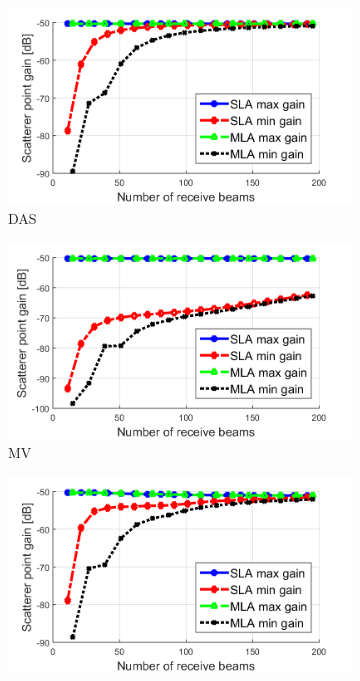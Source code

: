 \begin{figure}[ht]
    \centering
    \begin{subfigure}[t]{0.48\linewidth}
        \includegraphics[width=\linewidth]{./images/results/4/gain_DAS.png}
        \caption{DAS}
    \end{subfigure}
    \quad
    \begin{subfigure}[t]{0.48\linewidth}
        \includegraphics[width=\linewidth]{./images/results/4/gain_MV.png}
        \caption{MV}
    \end{subfigure}
    \quad
    \begin{subfigure}[t]{0.48\linewidth}
        \includegraphics[width=\linewidth]{./images/results/4/gain_IAA-MBSB.png}

\end{subfigure}
\end{figure}
